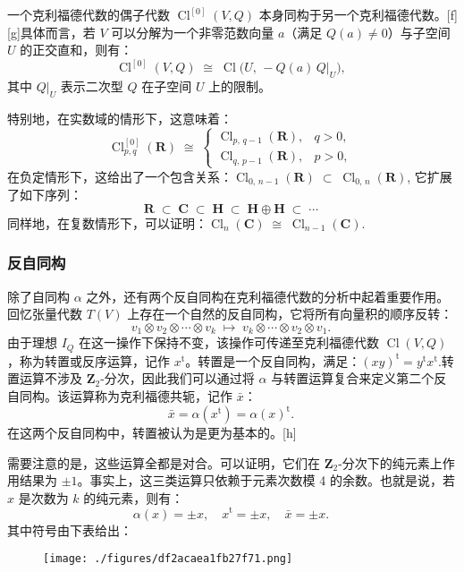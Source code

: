 一个克利福德代数的偶子代数 $\operatorname{Cl}^{[0]}(V, Q)$ 本身同构于另一个克利福德代数。[f][g]具体而言，若 $V$ 可以分解为一个非零范数向量 $a$（满足 $Q(a) \neq 0$）与子空间 $U$ 的正交直和，则有：
$$
\operatorname{Cl}^{[0]}(V, Q) \;\cong\; \operatorname{Cl}\bigl(U,\, -Q(a)\, Q|_U \bigr),~
$$
其中 $Q|_U$ 表示二次型 $Q$ 在子空间 $U$ 上的限制。

特别地，在实数域的情形下，这意味着：
$$
\operatorname{Cl}^{[0]}_{p,q}(\mathbf{R}) \;\cong\;
\begin{cases}
\operatorname{Cl}_{p,\,q-1}(\mathbf{R}), & q > 0, \\[6pt]
\operatorname{Cl}_{q,\,p-1}(\mathbf{R}), & p > 0,
\end{cases}~
$$
在负定情形下，这给出了一个包含关系：$\operatorname{Cl}_{0,\,n-1}(\mathbf{R}) \;\subset\; \operatorname{Cl}_{0,\,n}(\mathbf{R})$,
它扩展了如下序列：
$$
\mathbf{R} \;\subset\; \mathbf{C} \;\subset\; \mathbf{H} \;\subset\; \mathbf{H} \oplus \mathbf{H} \;\subset\; \cdots~
$$
同样地，在复数情形下，可以证明：$\operatorname{Cl}_n(\mathbf{C}) \;\cong\; \operatorname{Cl}_{n-1}(\mathbf{C})$.
\subsubsection{反自同构}
除了自同构 $\alpha$ 之外，还有两个反自同构在克利福德代数的分析中起着重要作用。回忆张量代数 $T(V)$ 上存在一个自然的反自同构，它将所有向量积的顺序反转：
$$
v_1 \otimes v_2 \otimes \cdots \otimes v_k 
\;\longmapsto\; 
v_k \otimes \cdots \otimes v_2 \otimes v_1.~
$$
由于理想 $I_Q$ 在这一操作下保持不变，该操作可传递至克利福德代数 $\operatorname{Cl}(V, Q)$，称为转置或反序运算，记作 $x^{\mathrm{t}}$。转置是一个反自同构，满足：$(xy)^{\mathrm{t}} = y^{\mathrm{t}} x^{\mathrm{t}}$.转置运算不涉及 $\mathbf{Z}_2$-分次，因此我们可以通过将 $\alpha$ 与转置运算复合来定义第二个反自同构。该运算称为克利福德共轭，记作 $\bar{x}$：
$$
\bar{x} = \alpha(x^{\mathrm{t}}) = \alpha(x)^{\mathrm{t}}.~
$$
在这两个反自同构中，转置被认为是更为基本的。[h]

需要注意的是，这些运算全都是对合。可以证明，它们在 $\mathbf{Z}_2$-分次下的纯元素上作用结果为 $\pm 1$。事实上，这三类运算只依赖于元素次数模 4 的余数。也就是说，若 $x$ 是次数为 $k$ 的纯元素，则有：
$$
\alpha(x) = \pm x, 
\quad x^{\mathrm{t}} = \pm x, 
\quad \bar{x} = \pm x.~
$$
其中符号由下表给出：
\begin{figure}[ht]
\centering
\texttt{[image: ./figures/df2acaea1fb27f71.png]}
\caption{} \label{fig_KLFds_2}
\end{figure}
